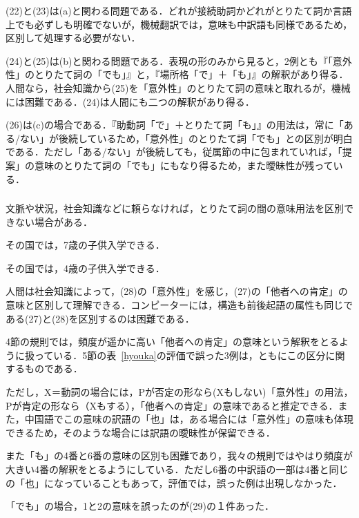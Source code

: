(22)と(23)は(a)と関わる問題である．どれが接続助詞かどれがとりたて詞か言語上でも必ずしも明確でないが，機械翻訳では，意味も中訳語も同様であるため，区別して処理する必要がない．

(24)と(25)は(b)と関わる問題である．表現の形のみから見ると，2例とも『「意外性」のとりたて詞の「でも」』と，『場所格「で」＋「も」』の解釈があり得る．人間なら，社会知識から(25)を「意外性」のとりたて詞の意味と取れるが，機械には困難である．(24)は人間にも二つの解釈があり得る．

(26)は(c)の場合である．『助動詞「で」＋とりたて詞「も」』の用法は，常に「ある/ない」が後続しているため，「意外性」のとりたて詞「でも」との区別が明白である．ただし「ある/ない」が後続しても，従属節の中に包まれていれば，「提案」の意味のとりたて詞の「でも」にもなり得るため，また曖昧性が残っている．


\subsubsection{}
文脈や状況，社会知識などに頼らなければ，とりたて詞の間の意味用法を区別できない場合がある．

\begin{enumerates}
 \setcounter{enumi}{26}
 \item その国では，7歳の子供入学できる．
 \item その国では，4歳の子供入学できる．
\end{enumerates}

人間は社会知識によって，(28)の「意外性」を感じ，(27)の「他者への肯定」の意味と区別して理解できる．コンピーターには，構造も前後起語の属性も同じである(27)と(28)を区別するのは困難である．

4節の規則では，頻度が遥かに高い「他者への肯定」の意味という解釈をとるように扱っている．5節の表~\ref{hyouka}の評価で誤った3例は，ともにこの区分に関するものである．

ただし，X＝動詞の場合には，Pが否定の形なら(Xもしない)「意外性」の用法，Pが肯定の形なら（Xもする），「他者への肯定」の意味であると推定できる．また，中国語でこの意味の訳語の「也」は，ある場合には「意外性」の意味も体現できるため，そのような場合には訳語の曖昧性が保留できる．

また「も」の4番と6番の意味の区別も困難であり，我々の規則ではやはり頻度が大きい4番の解釈をとるようにしている．ただし6番の中訳語の一部は4番と同じの「也」になっていることもあって，評価では，誤った例は出現しなかった．

「でも」の場合，1と2の意味を誤ったのが(29)の１件あった．

